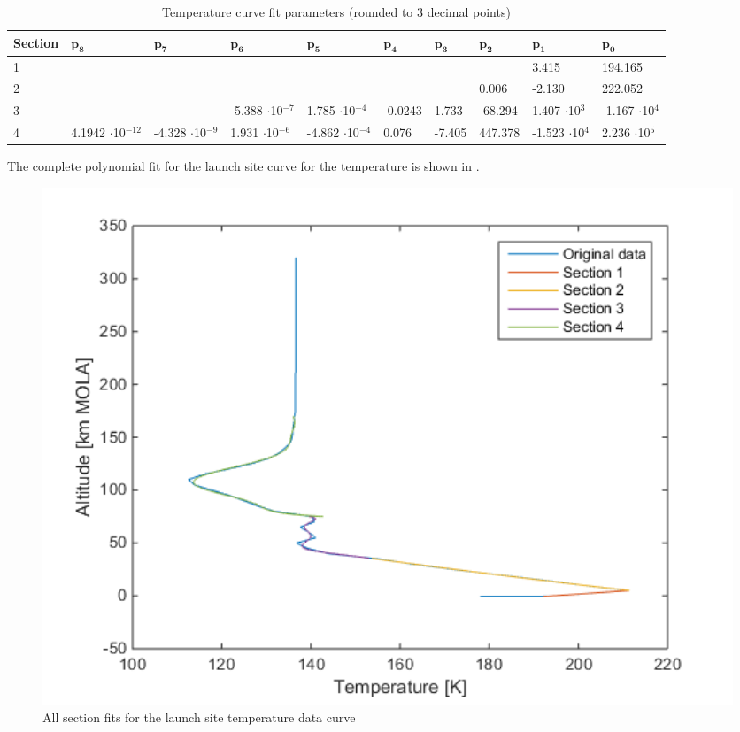 \begin{table}[!ht]
\begin{center}
\caption{Temperature curve fit parameters (rounded to 3 decimal points)}
\label{tab:fitParameters}
\begin{tabular}{|l||p{1.1cm}|p{1.1cm}|p{1.1cm}|p{1.1cm}|p{1.1cm}|p{1.1cm}|p{1.1cm}|p{1.1cm}|p{1.1cm}|}
\hline 
\textbf{Section}  & $\mathbf{p_{8}}$ & $\mathbf{p_{7}}$ & $\mathbf{p_{6}}$ & $\mathbf{p_{5}}$ & $\mathbf{p_{4}}$ & $\mathbf{p_{3}}$ & $\mathbf{p_{2}}$ & $\mathbf{p_{1}}$ & $\mathbf{p_{0}}$ \\ \hline 
1 &  &  &  &  &  &  & & 3.415 & 194.165   \\ \hline
2 &  &  &  &  &  & & 0.006 & -2.130 & 222.052   \\ \hline
3  &  &  & -5.388 $\cdot$10$^{-7}$ & 1.785 $\cdot$10$^{-4}$ & -0.0243 & 1.733 & -68.294 & 1.407 $\cdot$10$^{3}$ & -1.167 $\cdot$10$^{4}$ \\ \hline
4  & 4.1942 $\cdot$10$^{-12}$ & -4.328 $\cdot$10$^{-9}$ & 1.931 $\cdot$10$^{-6}$ & -4.862 $\cdot$10$^{-4}$ & 0.076 & -7.405 & 447.378 & -1.523 $\cdot$10$^{4}$ & 2.236 $\cdot$10$^{5}$ \\ \hline
\end{tabular}
\end{center}
\end{table}

The complete polynomial fit for the launch site curve for the temperature is shown in .

\begin{figure}[!ht]
\centering
\includegraphics[width=1.0\textwidth]{figures/software/completePolyFitTempSplit5.png}
\caption{All section fits for the launch site temperature data curve}
\label{fig:completePolyFitTempSplit5}
\end{figure}




